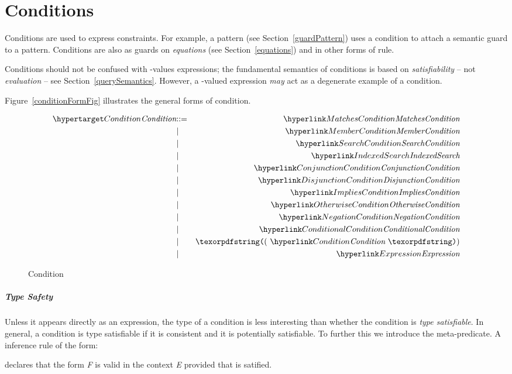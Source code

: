 \chapter{Conditions}
\label{conditions}
Conditions are used to express constraints. For example, a  pattern (see Section~\vref{guardPattern}) uses a condition to attach a semantic guard to a pattern. Conditions are also as guards on \emph{equations} (see Section~\vref{equations}) and in other forms of rule.


\begin{aside}
Conditions should not be confused with -values expressions; the fundamental semantics of conditions is based on \emph{satisfiability} -- not \emph{evaluation} -- see Section~\vref{querySemantics}. However, a -valued expression \emph{may} act as a degenerate example of a condition.
\end{aside}

Figure~\vref{conditionFormFig} illustrates the general forms of condition. 

\begin{figure}[htbp]
\begin{eqnarray*}
\ntDef{Condition}&\arrow&\ntRef{MatchesCondition}\\
&\choice&\ntRef{MemberCondition}\\
&\choice&\ntRef{SearchCondition}\\
&\choice&\ntRef{IndexedSearch}\\
&\choice&\ntRef{ConjunctionCondition}\\
&\choice&\ntRef{DisjunctionCondition}\\
&\choice&\ntRef{ImpliesCondition}\\
&\choice&\ntRef{OtherwiseCondition}\\
&\choice&\ntRef{NegationCondition}\\
&\choice&\ntRef{ConditionalCondition}\\
&\choice&\q{(}\ \ntRef{Condition}\ \q{)}\\
&\choice&\ntRef{Expression}
\end{eqnarray*}
\caption{Condition}
\label{conditionFormFig}
\end{figure}

\paragraph{Type Safety}
Unless it appears directly as an expression, the type of a condition is less interesting than whether the condition is \emph{type satisfiable}. In general, a condition is type satisfiable if it is consistent and it is potentially satisfiable. To further this we introduce the \satinf{} meta-predicate. A inference rule of the form:
\begin{prooftree}
\end{prooftree}
declares that the form \emph{F} is valid in the context \emph{E} provided that  is satified.

